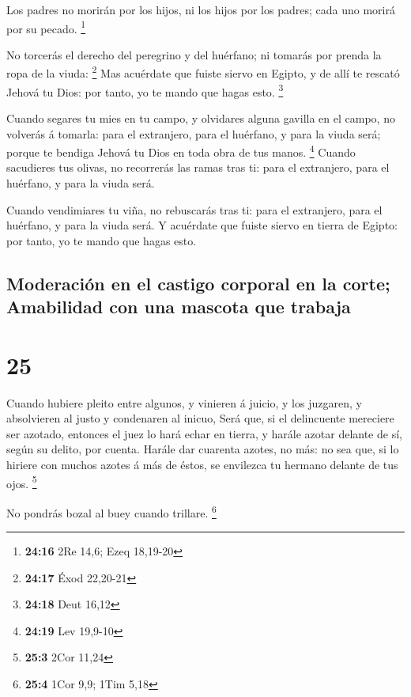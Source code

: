  Los padres no morirán por los hijos, ni los hijos por los
padres; cada uno morirá por su pecado. \footnote{\textbf{24:16} 2Re
  14,6; Ezeq 18,19-20}

 No torcerás el derecho del peregrino y del huérfano; ni
tomarás por prenda la ropa de la viuda: \footnote{\textbf{24:17} Éxod
  22,20-21}  Mas acuérdate que fuiste siervo en Egipto, y
de allí te rescató Jehová tu Dios: por tanto, yo te mando que hagas
esto. \footnote{\textbf{24:18} Deut 16,12}

 Cuando segares tu mies en tu campo, y olvidares alguna
gavilla en el campo, no volverás á tomarla: para el extranjero, para el
huérfano, y para la viuda será; porque te bendiga Jehová tu Dios en toda
obra de tus manos. \footnote{\textbf{24:19} Lev 19,9-10} 
Cuando sacudieres tus olivas, no recorrerás las ramas tras ti: para el
extranjero, para el huérfano, y para la viuda será.

 Cuando vendimiares tu viña, no rebuscarás tras ti: para el
extranjero, para el huérfano, y para la viuda será.  Y
acuérdate que fuiste siervo en tierra de Egipto: por tanto, yo te mando
que hagas esto.

\hypertarget{moderaciuxf3n-en-el-castigo-corporal-en-la-corte-amabilidad-con-una-mascota-que-trabaja}{%
\subsection{Moderación en el castigo corporal en la corte; Amabilidad
con una mascota que
trabaja}\label{moderaciuxf3n-en-el-castigo-corporal-en-la-corte-amabilidad-con-una-mascota-que-trabaja}}

\hypertarget{section-24}{%
\section{25}\label{section-24}}

 Cuando hubiere pleito entre algunos, y vinieren á juicio, y
los juzgaren, y absolvieren al justo y condenaren al inicuo,
 Será que, si el delincuente mereciere ser azotado, entonces
el juez lo hará echar en tierra, y harále azotar delante de sí, según su
delito, por cuenta.  Harále dar cuarenta azotes, no más: no
sea que, si lo hiriere con muchos azotes á más de éstos, se envilezca tu
hermano delante de tus ojos. \footnote{\textbf{25:3} 2Cor 11,24}

 No pondrás bozal al buey cuando trillare. \footnote{\textbf{25:4}
  1Cor 9,9; 1Tim 5,18}

